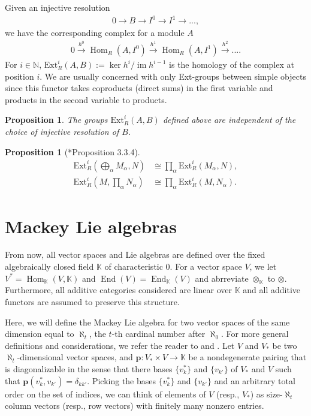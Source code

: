 \documentclass[openany, a4paper]{amsbook}
\newtheorem{prop}[thm]{Proposition}
\theoremstyle{definition}
\numberwithin{equation}{chapter}
\DeclareMathOperator{\Hom}{\mathrm{Hom}}
\DeclareMathOperator{\End}{\mathrm{End}}
\DeclareMathOperator{\im}{\mathrm{im}}
\newcommand{\Ext}[4]{\mathrm{Ext}^{#1}_{#2}({#3}, {#4})}
\begin{document}
Given an injective resolution
\begin{align*}
    0 \to B \to I^0 \to I^1 \to ...,
\end{align*} 
we have the corresponding complex for a module $A$
\begin{align*}
    0 \xrightarrow{h^0} \Hom_R(A, I^0) \xrightarrow{h^1}  \Hom_R(A, I^1) \xrightarrow{h^2} ... .
\end{align*} 
For $i \in \mathbb{N}$, $\Ext{i}{R}{A}{B} := \ker h^{i}/\im h^{i-1}$ is the homology of the complex at position $i$. We are usually concerned with only Ext-groups between simple objects since this functor takes coproducts (direct sums) in the first variable and products in the second variable to products. 

\begin{prop}
    The groups $\Ext{i}{R}{A}{B}$ defined above
    are independent of the choice of injective resolution of $B$.
\end{prop}

\begin{prop}[\cite{weibel}*{Proposition 3.3.4}]
    \begin{align}
        \Ext{i}{R}{\bigoplus _{\alpha }M_{\alpha }}{N} &\cong \prod _{\alpha } \Ext{i}{R}{M_{\alpha }}{N},\\
        \Ext{i}{R}{M}{\prod _{\alpha }N_{\alpha }} &\cong \prod _{\alpha } \Ext{i}{R}{M}{N_{\alpha }}.
    \end{align}
\end{prop}



\section{Mackey Lie algebras}
From now, all vector spaces and Lie algebras are defined over the fixed algebraically closed field $\mathbb{K}$ of characteristic $0$. For a vector space $V$, we let $V^\ast = \Hom_{\mathbb{K}}(V, \mathbb{K})$ and $\End(V) = \End_{\mathbb{K}}(V)$ and abrreviate $\otimes_\mathbb{K}$ to $\otimes$. Furthermore, all additive categories considered are linear over $\mathbb{K}$ and all additive functors are assumed to preserve this structure.

Here, we will define the Mackey Lie algebra for two vector spaces of the same dimension equal to $\aleph_t$, the $t$-th cardinal number after $\aleph_0$. For more general definitions and considerations, we refer the reader to \cite[]{ps14} and \cite[]{cp17}. Let $V$ and $V_{\ast}$ be two $\aleph_t$-dimensional vector spaces, and $\mathbf{p}: V_\ast \times V \to \mathbb{K}$ be a nondegenerate pairing that is diagonalizable in the sense that there bases $\{v^{\ast}_{k} \}$ and $\{v_{k'} \}$ of $V_\ast$ and $V$ such that $\mathbf{p}(v^{\ast}_{k}, v_{k'}) = \delta_{k k '}$. Picking the bases $\{v^{\ast}_{k} \}$ and  $\{v_{k'} \}$ and an arbitrary total order on the set of indices, we can think of elements of $V$ (resp., $V_\ast$) as size-$\aleph_t$ column vectors (resp., row vectors) with finitely many nonzero entries. 
\end{document}
